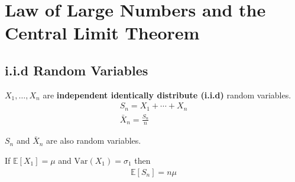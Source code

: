 \section{Law of Large Numbers and the Central Limit Theorem}

\subsection{i.i.d Random Variables}

$X_1, \ldots , X_n$ are \textbf{independent identically distribute (i.i.d)} random variables.
\begin{gather*}
    S_n = X_1 + \cdots + X_n \\
    \bar{X}_n = \frac{S_n}{n}
\end{gather*}

$S_n$ and $ \bar{X}_n$ are also random variables.

If $\mathbb{E}[X_1]=\mu$ and $\mathrm{Var}(X_1)=\sigma_1$ then
\begin{gather*}
    \mathbb{E}[S_n]=n\mu
\end{gather*}